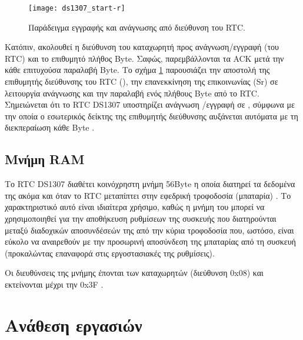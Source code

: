 \begin{figure}
    \caption{Παράδειγμα εγγραφής και ανάγνωσης από διεύθυνση του RTC.
    \label{fig:rtc:start-r}}
    \begin{center}
    \texttt{[image: ds1307\_start-r]}
    \end{center}
\end{figure}

Κατόπιν, ακολουθεί η διεύθυνση του καταχωρητή προς ανάγνωση\slash{}εγγραφή (του
RTC) και το επιθυμητό πλήθος Byte. Σαφώς, παρεμβάλλονται τα  ACK μετά
την κάθε επιτυχούσα παραλαβή Byte. Το σχήμα \ref{fig:rtc:start-r} παρουσιάζει
την αποστολή της επιθυμητής διεύθυνσης του RTC (), την
επανεκκίνηση της επικοινωνίας (Sr) σε λειτουργία ανάγνωσης και την παραλαβή ενός
πλήθους Byte από το RTC. Σημειώνεται ότι το RTC DS1307 υποστηρίζει ανάγνωση%
\slash{}εγγραφή σε , σύμφωνα με την οποία ο εσωτερικός δείκτης
της επιθυμητής διεύθυνσης αυξάνεται αυτόματα με τη διεκπεραίωση κάθε Byte
\parencite[12]{ds1307}.


\subsection{Μνήμη RAM}

Το RTC DS1307 διαθέτει κοινόχρηστη μνήμη 56Byte η οποία διατηρεί τα δεδομένα της
ακόμα και όταν το RTC μεταπίπτει στην εφεδρική τροφοδοσία (μπαταρία)
\parencite[1]{ds1307}. Το χαρακτηριστικό αυτό είναι ιδιαίτερα χρήσιμο, καθώς η
μνήμη του μπορεί να χρησιμοποιηθεί για την αποθήκευση ρυθμίσεων της συσκευής που
διατηρούνται μεταξύ διαδοχικών αποσυνδέσεών της από την κύρια τροφοδοσία που,
ωστόσο, είναι εύκολο να αναιρεθούν με την προσωρινή αποσύνδεση της μπαταρίας από
τη συσκευή (προκαλώντας επαναφορά στις εργοστασιακές της ρυθμίσεις).

Οι διευθύνσεις της μνήμης έπονται των καταχωρητών (διεύθυνση 0x08) και
εκτείνονται μέχρι την 0x3F \parencite[8]{ds1307}.




\section{Ανάθεση εργασιών}

